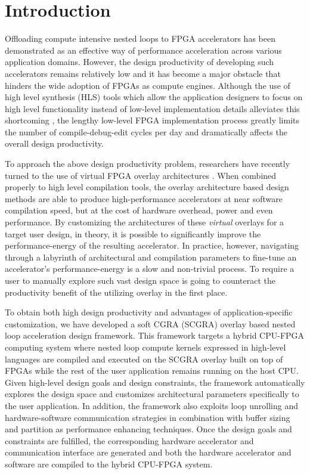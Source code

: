 \section{Introduction}
Offloading compute intensive nested loops to FPGA accelerators has 
been demonstrated as an effective way of performance 
acceleration across various application domains\cite{Chung2010}. 
However, the design productivity of developing such accelerators 
remains relatively low and it has become a major obstacle that 
hinders the wide adoption of FPGAs as compute engines. Although the use of 
high level synthesis (HLS) tools which allow the application designers to 
focus on high level functionality instead of low-level implementation details alleviates 
this shortcoming \cite{cong2011high}, the lengthy low-level FPGA implementation process 
greatly limits the number of compile-debug-edit cycles per day and dramatically 
affects the overall design productivity. 

To approach the above design productivity problem, 
researchers have recently turned to the use of virtual FPGA overlay 
architectures \cite{Grant2011Malibu,ZUMA2012,mesh-FUs,
ferreira2011fpga, kissler2006dynamically,scgra}. When combined properly to 
high level compilation tools, the overlay architecture based design methods 
are able to produce high-performance accelerators at near software 
compilation speed, but at the cost of hardware overhead, power and even performance.
By customizing the architectures of these \emph{virtual} 
overlays for a target user design, in theory, it is 
possible to significantly improve the performance-energy of the 
resulting accelerator. In practice, however, navigating through a 
labyrinth of architectural and compilation parameters to fine-tune 
an accelerator's performance-energy is a slow and non-trivial process. 
To require a user to manually explore such vast design space is going 
to counteract the productivity benefit of the utilizing overlay 
in the first place.

To obtain both high design productivity and advantages of 
application-specific customization, we have developed a 
soft CGRA (SCGRA) overlay based nested loop acceleration design 
framework. This framework targets a hybrid CPU-FPGA computing system where 
nested loop compute kernels expressed in high-level languages are compiled and 
executed on the SCGRA overlay built on top of FPGAs while the rest of the 
user application remains running on the host CPU. Given high-level design 
goals and design constraints, the framework automatically explores the 
design space and customizes architectural parameters specifically to the 
user application. In addition, the framework also exploits loop unrolling 
and hardware-software communication strategies in combination 
with buffer sizing and partition as performance enhancing techniques.
Once the design goals and constraints are fulfilled, the 
corresponding hardware accelerator and communication interface 
are generated and both the hardware accelerator and software 
are compiled to the hybrid CPU-FPGA system.  


